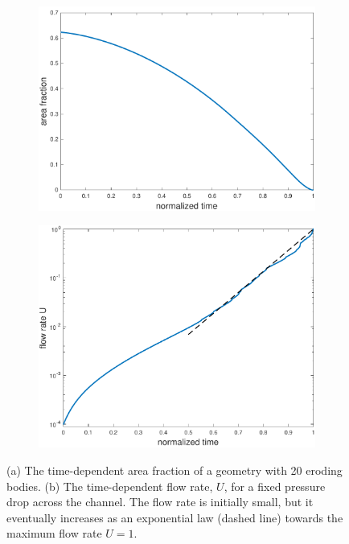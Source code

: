 \documentclass{jfm}
\begin{document}
\begin{figure}
\begin{subfigure}[b]{0.5\textwidth}
\includegraphics*[height = 0.7\linewidth]{./figs/porosity20dense}
\caption{}
\end{subfigure}
\begin{subfigure}[b]{0.5\textwidth}
\includegraphics*[height = 0.7\linewidth]{./figs/flow_rate20densen}
\caption{}
\end{subfigure}
\caption{\label{fig:Eroding20flowrate}(a) The time-dependent area
fraction of a geometry with 20 eroding bodies. (b) The time-dependent
flow rate, $U$, for a fixed pressure drop across the channel.  The flow
rate is initially small, but it eventually increases as an exponential
law (dashed line) towards the maximum flow rate $U=1$.}
\end{figure}
\end{document}
